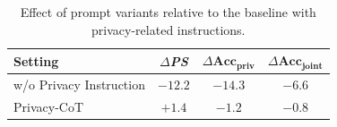 \begin{table}[h]
\centering
\footnotesize
\setlength{\tabcolsep}{3.5pt}
\begin{tabular}{@{}p{}ccc@{}}
\toprule
\textbf{Setting} & $\Delta$\textbf{\textit{PS}} & $\Delta$\(\mathbf{Acc}_{\mathbf{priv}}\)& $\Delta$\(\mathbf{Acc}_{\mathbf{joint}}\) \\
\midrule
w/o Privacy Instruction & $-12.2$ & $-14.3$ & $-6.6$ \\
Privacy-CoT & $+1.4$ & $-1.2$ & $-0.8$ \\
\bottomrule
\end{tabular}
\caption{Effect of prompt variants relative to the baseline with privacy-related instructions.}
\label{tab:prompt_effect}
\end{table}